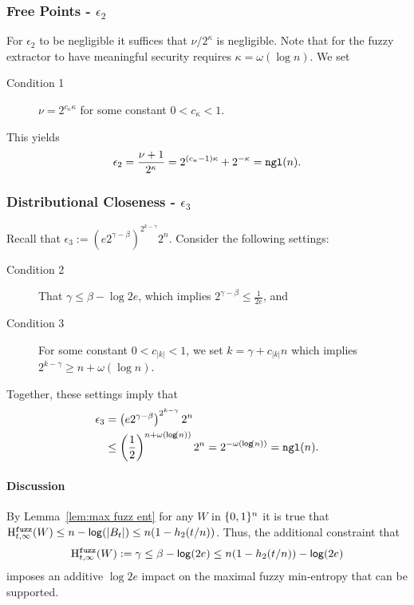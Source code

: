 \subsubsection{Free Points - $\epsilon_2$}
For $\epsilon_2$ to be negligible it suffices that $\nu/2^\kappa$ is negligible.  Note that for the fuzzy extractor to have meaningful security requires $\kappa = \omega(\log{n})$.  We set
\begin{description}
\item[Condition 1] $\nu = 2^{c_{\kappa}\kappa}$ for some constant $0 < c_{\kappa}<1$.
\end{description} 
This yields 
\[
\epsilon_2= \frac{\nu+1}{2^\kappa} = 2^{(c_{\kappa}-1)\kappa}+ 2^{-\kappa} = \mathtt{ngl}(n).
\]
\subsubsection{Distributional Closeness - $\epsilon_3$}
Recall that $\epsilon_3:=\left(e2^{\gamma-\beta}\right)^{2^{k-\gamma}}2^n$.  Consider the following settings:
\begin{description}
\item[Condition 2] That $\gamma\le \beta-\log{2e}$, which implies $2^{\gamma - \beta} \le \frac{1}{2e}$, and 
\item[Condition 3] For some constant $0<c_{|k|} < 1$, we set $k = \gamma + c_{|k|}n$ which implies $2^{k-\gamma}\ge n+\omega(\log{n})$. 
\end{description}
Together, these settings imply that 
\begin{align*}
\epsilon_3&=\left(e2^{\gamma-\beta}\right)^{2^{k-\gamma}}2^n\\
&\le\left(\frac{1}{2}\right)^{n+\omega(\mathsf{log}\!\left(n\right))}2^n= 2^{-\omega(\mathsf{log}\!\left(n\right))} = \mathtt{ngl}(n).
\end{align*}

\paragraph{Discussion}
By Lemma~\ref{lem:max fuzz ent} for any $W$ in $\{0, 1\}^n$ it is true that $\mathrm{H}^{\mathtt{fuzz}}_{t,\infty}(W) \le n -\mathsf{log}\!\left(|B_t|\right) \le n(1-h_2(t/n))$.  Thus, the additional constraint that 
\[
\mathrm{H}^{\mathtt{fuzz}}_{t,\infty}(W):=\gamma \le \beta - \mathsf{log}\!\left(2e\right)
\le n(1-h_2(t/n)) - \mathsf{log}\!\left(2e\right)\] imposes an additive $\log{2e}$ impact on the maximal fuzzy min-entropy that can be supported. 


